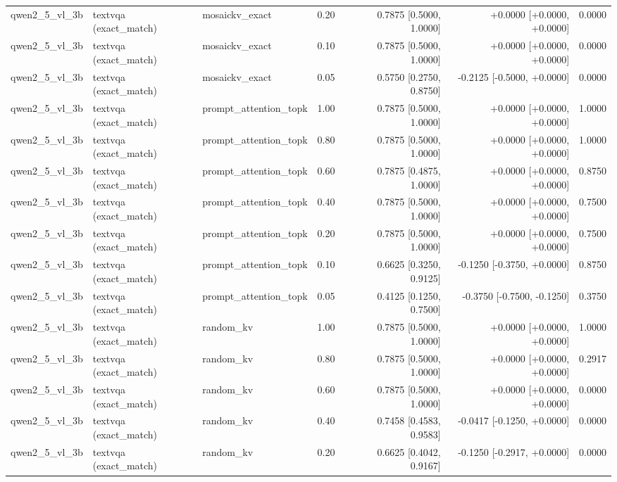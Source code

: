 \begin{longtable}{lllrrrr}
qwen2\_5\_vl\_3b & textvqa (exact\_match) & mosaickv\_exact & 0.20 & 0.7875 [0.5000, 1.0000] & +0.0000 [+0.0000, +0.0000] & 0.0000 \\
qwen2\_5\_vl\_3b & textvqa (exact\_match) & mosaickv\_exact & 0.10 & 0.7875 [0.5000, 1.0000] & +0.0000 [+0.0000, +0.0000] & 0.0000 \\
qwen2\_5\_vl\_3b & textvqa (exact\_match) & mosaickv\_exact & 0.05 & 0.5750 [0.2750, 0.8750] & -0.2125 [-0.5000, +0.0000] & 0.0000 \\
qwen2\_5\_vl\_3b & textvqa (exact\_match) & prompt\_attention\_topk & 1.00 & 0.7875 [0.5000, 1.0000] & +0.0000 [+0.0000, +0.0000] & 1.0000 \\
qwen2\_5\_vl\_3b & textvqa (exact\_match) & prompt\_attention\_topk & 0.80 & 0.7875 [0.5000, 1.0000] & +0.0000 [+0.0000, +0.0000] & 1.0000 \\
qwen2\_5\_vl\_3b & textvqa (exact\_match) & prompt\_attention\_topk & 0.60 & 0.7875 [0.4875, 1.0000] & +0.0000 [+0.0000, +0.0000] & 0.8750 \\
qwen2\_5\_vl\_3b & textvqa (exact\_match) & prompt\_attention\_topk & 0.40 & 0.7875 [0.5000, 1.0000] & +0.0000 [+0.0000, +0.0000] & 0.7500 \\
qwen2\_5\_vl\_3b & textvqa (exact\_match) & prompt\_attention\_topk & 0.20 & 0.7875 [0.5000, 1.0000] & +0.0000 [+0.0000, +0.0000] & 0.7500 \\
qwen2\_5\_vl\_3b & textvqa (exact\_match) & prompt\_attention\_topk & 0.10 & 0.6625 [0.3250, 0.9125] & -0.1250 [-0.3750, +0.0000] & 0.8750 \\
qwen2\_5\_vl\_3b & textvqa (exact\_match) & prompt\_attention\_topk & 0.05 & 0.4125 [0.1250, 0.7500] & -0.3750 [-0.7500, -0.1250] & 0.3750 \\
qwen2\_5\_vl\_3b & textvqa (exact\_match) & random\_kv & 1.00 & 0.7875 [0.5000, 1.0000] & +0.0000 [+0.0000, +0.0000] & 1.0000 \\
qwen2\_5\_vl\_3b & textvqa (exact\_match) & random\_kv & 0.80 & 0.7875 [0.5000, 1.0000] & +0.0000 [+0.0000, +0.0000] & 0.2917 \\
qwen2\_5\_vl\_3b & textvqa (exact\_match) & random\_kv & 0.60 & 0.7875 [0.5000, 1.0000] & +0.0000 [+0.0000, +0.0000] & 0.0000 \\
qwen2\_5\_vl\_3b & textvqa (exact\_match) & random\_kv & 0.40 & 0.7458 [0.4583, 0.9583] & -0.0417 [-0.1250, +0.0000] & 0.0000 \\
qwen2\_5\_vl\_3b & textvqa (exact\_match) & random\_kv & 0.20 & 0.6625 [0.4042, 0.9167] & -0.1250 [-0.2917, +0.0000] & 0.0000 \\

\end{longtable}
